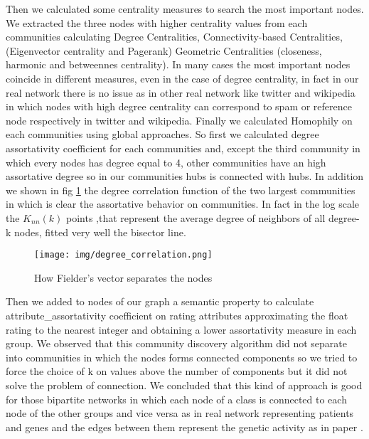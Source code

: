 \documentclass[sigchi]{acmart}
\begin{document}
Then we calculated some centrality measures to search the most important nodes.
We extracted the three nodes with higher centrality values from each communities calculating Degree Centralities, Connectivity-based Centralities, (Eigenvector centrality and Pagerank) Geometric Centralities (closeness, harmonic and betweennes centrality). In many cases the most important nodes coincide in different measures, even in the case of degree centrality, in fact in our real network there is no issue as in other real network like twitter and wikipedia in which nodes with high degree centrality can correspond to spam or reference node respectively in twitter and wikipedia.\newline
Finally we calculated Homophily on each communities using global approaches.
So first we calculated degree assortativity coefficient for each communities and, except the third community in which every nodes has degree equal to 4, other communities have an high assortative degree so in our communities hubs is connected with hubs. In addition we shown in fig \ref{deg_cor} the degree correlation function of the two largest communities in which is clear the assortative behavior on communities. In fact in the log scale the $K_{nn} \left( k \right)$ points ,that represent the average degree of neighbors of all degree-k nodes, fitted very well the bisector line.


\begin{figure}[h]
  \centering
  \texttt{[image: img/degree\_correlation.png]}
  \caption{How Fielder's vector separates the nodes}
  \label{deg_cor}
\end{figure}

Then we added to nodes of our graph a semantic property to calculate attribute\_assortativity coefficient on rating attributes approximating the float rating to the nearest integer \label{node_attr} and obtaining a lower assortativity measure in each group. \newline
We observed that this community discovery algorithm did not separate into communities in which the nodes forms connected components so we tried to force the choice of k on values above the number of components but it did not solve the problem of connection. We concluded that this kind of approach is good for those bipartite networks in which each node of a class is connected to each node of the other groups and vice versa as in real network representing patients and genes and the edges between them represent the genetic activity as in paper \cite{lorem}.
\end{document}
